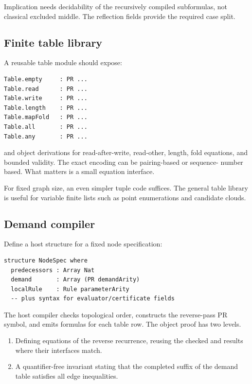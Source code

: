 Implication needs decidability of the recursively compiled subformulas, not
classical excluded middle.  The reflection fields provide the required case
split.

\subsection{Finite table library}

A reusable table module should expose:

\begin{lstlisting}[language={}]
Table.empty     : PR ...
Table.read      : PR ...
Table.write     : PR ...
Table.length    : PR ...
Table.mapFold   : PR ...
Table.all       : PR ...
Table.any       : PR ...
\end{lstlisting}

and object derivations for read-after-write, read-other, length, fold equations,
and bounded validity.  The exact encoding can be pairing-based or sequence-
number based.  What matters is a small equation interface.

For fixed graph size, an even simpler tuple code suffices.  The general table
library is useful for variable finite lists such as point enumerations and
candidate clouds.

\subsection{Demand compiler}

Define a host structure for a fixed node specification:

\begin{lstlisting}[language={}]
structure NodeSpec where
  predecessors : Array Nat
  demand       : Array (PR demandArity)
  localRule    : Rule parameterArity
  -- plus syntax for evaluator/certificate fields
\end{lstlisting}

The host compiler checks topological order, constructs the reverse-pass PR
symbol, and emits formulas for each table row.  The object proof has two
levels.

\begin{enumerate}
\item Defining equations of the reverse recurrence, reusing the checked
 and
 results where their interfaces match.
\item A quantifier-free invariant stating that the completed suffix of the
demand table satisfies all edge inequalities.
\end{enumerate}

